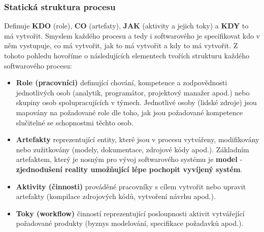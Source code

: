 \subsubsection{Statická struktura procesu}
Definuje \textbf{KDO} (role), \textbf{CO} (artefaty), \textbf{JAK} (aktivity a jejich toky) a \textbf{KDY} to má vytvořit. Smyslem každého procesu a tedy i softwarového je specifikovat kdo v něm vystupuje, co má vytvořit, jak to má vytvořit a kdy to má vytvořit.  Z tohoto pohledu hovoříme o následujících elementech tvořích strukturu každého softwarového procesu: 
\begin{itemize}
	\item \textbf{Role (pracovníci)} definující chování, kompetence a zodpovědnosti jednotlivých osob (analytik, programátor, projektový manažer apod.) nebo skupiny osob spolupracujících v týmech.  Jednotlivé osoby (lidské zdroje) jsou mapovány na požadované role dle toho, jak jsou požadované kompetence slučitelné se schopnostmi těchto osob.
\item \textbf{Artefakty} reprezentující entity, které jsou v procesu vytvářeny, modifikovány nebo zužitkovány (modely, dokumentace, zdrojové kódy apod.).  Základním artefaktem, který je nosným pro vývoj softwarového systému je \textbf{model} - \textbf{zjednodušení reality umožňující lépe pochopit vyvíjený systém}.
\item \textbf{Aktivity (činnosti)} prováděné pracovníky s cílem vytvořit nebo upravit artefakty (kompilace zdrojových kódů, vytvoření návrhu apod.).
\item \textbf{Toky (workflow)} činností reprezentující posloupnosti aktivit vytvářející požadované produkty (byznys modelování, specifikace požadavků apod.).
\end{itemize}

